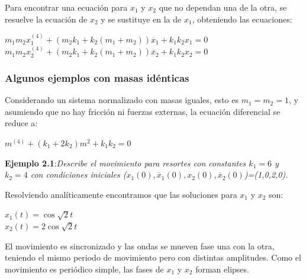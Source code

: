 \documentclass{article}
\begin{document}
Para encontrar una ecuación para $x_{1}$ y $x_{2}$ que no dependan una de la otra, se resuelve la ecuación de $x_{2}$ y se sustituye en la de $x_{1}$, obteniendo las ecuaciones:
\begin{center}
$m_{1}m_{2}x_{1}^{(4)}+(m_{2}k_{1}+k_{2}(m_{1}+m_{2}))\ddot{x_{1}}+k_{1}k_{2}x_{1}=0$
$m_{1}m_{2}x_{2}^{(4)}+(m_{2}k_{1}+k_{2}(m_{1}+m_{2}))\ddot{x_{2}}+k_{1}k_{2}x_{2}=0$
\end{center}
\subsubsection{Algunos ejemplos con masas idénticas}
Considerando un sistema normalizado con masas iguales, esto es $m_{1}=m_{2}=1$, y asumiendo que no hay fricción ni fuerzas externas, la ecuación diferencial se reduce a:
\begin{center}
$m^{(4)}+(k_{1}+2k_{2})m^{2}+k_{1}k_{2}=0$
\end{center}
\textbf{Ejemplo 2.1}:\textsl{Describe el movimiento para resortes con constantes $k_{1}=6$ y $k_{2}=4$ con condiciones iniciales ($x_{1}(0),\dot{x_{1}}(0), x_{2}(0),\dot{x_{2}}(0)$)=(1,0,2,0).}

Resolviendo analíticamente encontramos que las soluciones para $x_{1}$ y $x_{2}$ son:
\begin{center}
$x_{1}(t)=\cos{\sqrt{2}t}$ \\
$x_{2}(t)=2\cos{\sqrt{2}t}$
\end{center}

El movimiento es sincronizado y las ondas se mueven fase una con la otra, teniendo el mismo periodo de movimiento pero con distintas amplitudes. Como el movimiento es periódico simple, las fases de $x_{1}$ y $x_{2}$ forman elipses.
\end{document}
